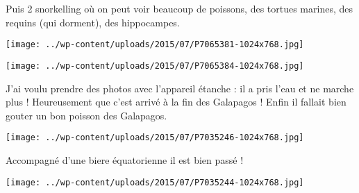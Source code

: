 Puis 2 snorkelling où on peut voir beaucoup de poissons, des tortues marines, des requins (qui dorment), des hippocampes. \newline
 \newline
\centerline{\texttt{[image: ../wp-content/uploads/2015/07/P7065381-1024x768.jpg]} } 
 \newline
 \newline
\centerline{\texttt{[image: ../wp-content/uploads/2015/07/P7065384-1024x768.jpg]} } 
 \newline
 J'ai voulu prendre des photos avec l'appareil étanche : il a pris l'eau et ne marche plus ! Heureusement que c'est arrivé à la fin des Galapagos ! \newline
 Enfin il fallait bien gouter un bon poisson des Galapagos. \newline
 \newline
\centerline{\texttt{[image: ../wp-content/uploads/2015/07/P7035246-1024x768.jpg]} } 
 \newline
 Accompagné d'une biere équatorienne il est bien passé ! \newline
 \newline
\centerline{\texttt{[image: ../wp-content/uploads/2015/07/P7035244-1024x768.jpg]} } 
 \newline

\newpage
 

